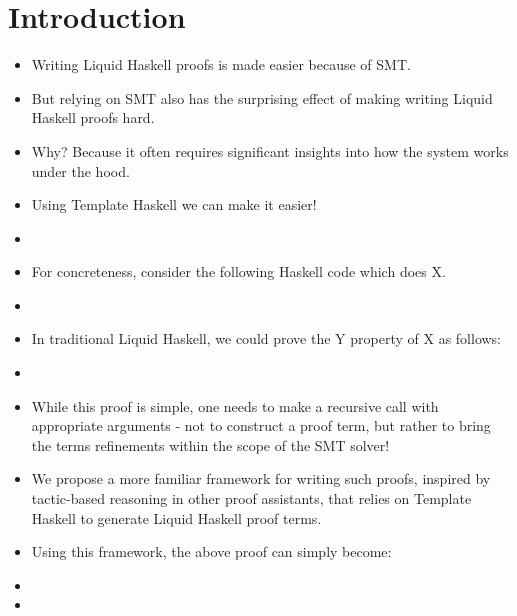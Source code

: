 \documentclass[sigplan,screen]{acmart}
\begin{document}


\maketitle

\section{Introduction}

\begin{itemize}
\item Writing Liquid Haskell proofs is made easier because of SMT.
\item But relying on SMT also has the surprising effect of making writing Liquid
  Haskell proofs hard.
\item Why? Because it often requires significant insights into how the system
  works under the hood.
\item Using Template Haskell we can make it easier!
\item
\item For concreteness, consider the following Haskell code which does X.
\item {}
\item In traditional Liquid Haskell, we could prove the Y property of X as follows:
\item {}
\item While this proof is simple, one needs to make a recursive call with appropriate
  arguments - not to construct a proof term, but rather to bring the terms refinements
  within the scope of the SMT solver!
\item We propose a more familiar framework for writing such proofs, inspired by
  tactic-based reasoning in other proof assistants, that relies on Template Haskell
  to generate Liquid Haskell proof terms.
\item Using this framework, the above proof can simply become:
\item {}
\item {}
\end{itemize}  
\end{document}
